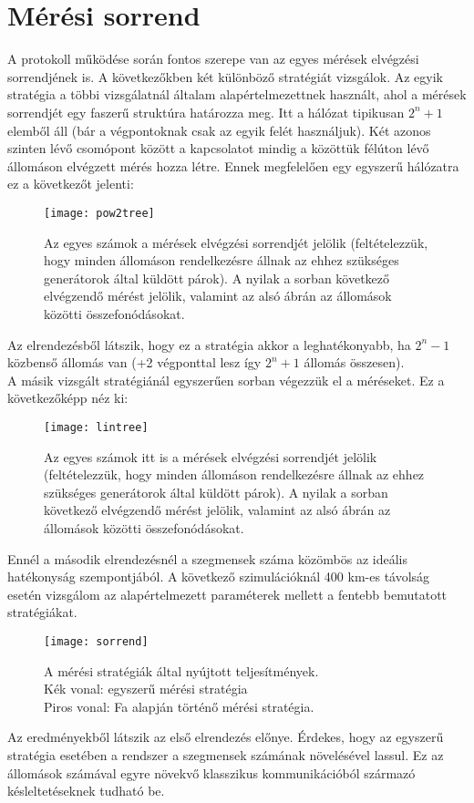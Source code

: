 \section{Mérési sorrend}

A protokoll működése során fontos szerepe van az egyes mérések elvégzési sorrendjének is. A következőkben két különböző stratégiát vizsgálok. Az egyik stratégia a többi vizsgálatnál általam alapértelmezettnek használt, ahol a mérések sorrendjét egy faszerű struktúra határozza meg. Itt a hálózat tipikusan $2^n+1$ elemből áll (bár a végpontoknak csak az egyik felét használjuk). Két azonos szinten lévő csomópont között a kapcsolatot mindig a közöttük félúton lévő állomáson elvégzett mérés hozza létre. Ennek megfelelően egy egyszerű hálózatra ez a következőt jelenti:
\begin{figure}[H]
\centering
\texttt{[image: pow2tree]}
\caption[Fa alapján történő mérési stratégia]{Az egyes számok a mérések elvégzési sorrendjét jelölik (feltételezzük, hogy minden állomáson rendelkezésre állnak az ehhez szükséges generátorok által küldött párok). A nyilak a sorban következő elvégzendő mérést jelölik, valamint az alsó ábrán az állomások közötti összefonódásokat.}
\end{figure}
Az elrendezésből látszik, hogy ez a stratégia akkor a leghatékonyabb, ha $2^n-1$ közbenső állomás van (+2 végponttal lesz így $2^n+1$ állomás összesen).\\
A másik vizsgált stratégiánál egyszerűen sorban végezzük el a méréseket. Ez a következőképp néz ki:
\begin{figure}[H]
\centering
\texttt{[image: lintree]}
\caption[Egyszerű mérési stratégia]{Az egyes számok itt is a mérések elvégzési sorrendjét jelölik (feltételezzük, hogy minden állomáson rendelkezésre állnak az ehhez szükséges generátorok által küldött párok). A nyilak a sorban következő elvégzendő mérést jelölik, valamint az alsó ábrán az állomások közötti összefonódásokat.}
\end{figure}
Ennél a második elrendezésnél a szegmensek száma közömbös az ideális hatékonyság szempontjából. A következő szimulációknál 400 km-es távolság esetén vizsgálom az alapértelmezett paraméterek mellett a fentebb bemutatott stratégiákat.
\begin{figure}[H]
\centering
\texttt{[image: sorrend]}
\caption[Mérési stratégiák]{A mérési stratégiák által nyújtott teljesítmények.\\
Kék vonal: egyszerű mérési stratégia\\
Piros vonal: Fa alapján történő mérési stratégia.
}
\end{figure}
Az eredményekből látszik az első elrendezés előnye. Érdekes, hogy az egyszerű stratégia esetében a rendszer a szegmensek számának növelésével lassul. Ez az állomások számával egyre növekvő klasszikus kommunikációból származó késleltetéseknek tudható be.


